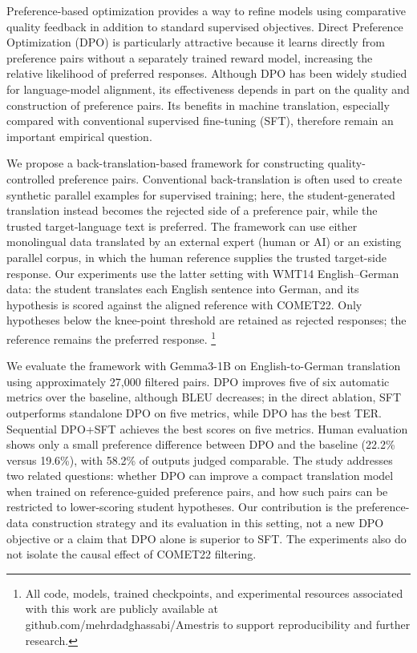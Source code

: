 \documentclass[conference]{IEEEtran}
\begin{document}
Preference-based optimization provides a way to refine models using comparative quality feedback in addition to standard supervised objectives. Direct Preference Optimization (DPO) is particularly attractive because it learns directly from preference pairs without a separately trained reward model, increasing the relative likelihood of preferred responses. \cite{b2} Although DPO has been widely studied for language-model alignment, its effectiveness depends in part on the quality and construction of preference pairs. Its benefits in machine translation, especially compared with conventional supervised fine-tuning (SFT), therefore remain an important empirical question.

We propose a back-translation-based framework for constructing quality-controlled preference pairs. Conventional back-translation is often used to create synthetic parallel examples for supervised training; here, the student-generated translation instead becomes the rejected side of a preference pair, while the trusted target-language text is preferred. The framework can use either monolingual data translated by an external expert (human or AI) or an existing parallel corpus, in which the human reference supplies the trusted target-side response. Our experiments use the latter setting with WMT14 English--German data: the student translates each English sentence into German, and its hypothesis is scored against the aligned reference with COMET22. Only hypotheses below the knee-point threshold are retained as rejected responses; the reference remains the preferred response.
\footnote{All code, models, trained checkpoints, and experimental resources associated with this work are publicly available at github.com/mehrdadghassabi/Amestris to support reproducibility and further research.}

We evaluate the framework with Gemma3-1B on English-to-German translation using approximately 27,000 filtered pairs. DPO improves five of six automatic metrics over the baseline, although BLEU decreases; in the direct ablation, SFT outperforms standalone DPO on five metrics, while DPO has the best TER. Sequential DPO+SFT achieves the best scores on five metrics. Human evaluation shows only a small preference difference between DPO and the baseline (22.2\% versus 19.6\%), with 58.2\% of outputs judged comparable. The study addresses two related questions: whether DPO can improve a compact translation model when trained on reference-guided preference pairs, and how such pairs can be restricted to lower-scoring student hypotheses. Our contribution is the preference-data construction strategy and its evaluation in this setting, not a new DPO objective or a claim that DPO alone is superior to SFT. The experiments also do not isolate the causal effect of COMET22 filtering.
\end{document}
